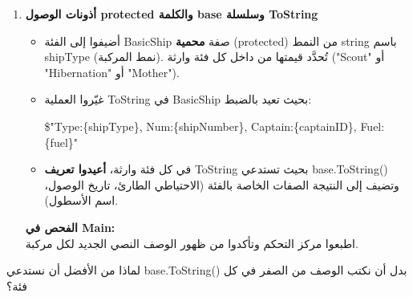 \documentclass[14pt]{extarticle}
\begin{document}
\begin{enumerate}[label=\textbf{تمرين \arabic*:}, wide=0pt, leftmargin=*, itemsep=2.2em]
    \item \textbf{أذونات الوصول \textenglish{protected} والكلمة \textenglish{base} وسلسلة \textenglish{ToString}}
    \begin{itemize}
        \item أضيفوا إلى الفئة \textenglish{BasicShip} صفة \textbf{محمية} (\textenglish{protected}) من النمط \textenglish{string} باسم \textenglish{shipType} (نمط المركبة). تُحدَّد قيمتها من داخل كل فئة وارثة (\textenglish{"Scout"} أو \textenglish{"Hibernation"} أو \textenglish{"Mother"}).
        \item غيّروا العملية \textenglish{ToString} في \textenglish{BasicShip} بحيث تعيد بالضبط:
        \begin{center}
        \textenglish{\$"Type:\{shipType\}, Num:\{shipNumber\}, Captain:\{captainID\}, Fuel:\{fuel\}"}
        \end{center}
        \item في كل فئة وارثة، \textbf{أعيدوا تعريف} \textenglish{ToString} بحيث تستدعي \textenglish{base.ToString()} وتضيف إلى النتيجة الصفات الخاصة بالفئة (الاحتياطي الطارئ، تاريخ الوصول، اسم الأسطول).
    \end{itemize}
    \textbf{الفحص في \textenglish{Main}:} \\
    اطبعوا مركز التحكم وتأكدوا من ظهور الوصف النصي الجديد لكل مركبة.

\end{enumerate}

\begin{boxAttention}
لماذا من الأفضل أن نستدعي \textenglish{base.ToString()} بدل أن نكتب الوصف من الصفر في كل فئة؟
\end{boxAttention}

\clearpage
\end{document}
